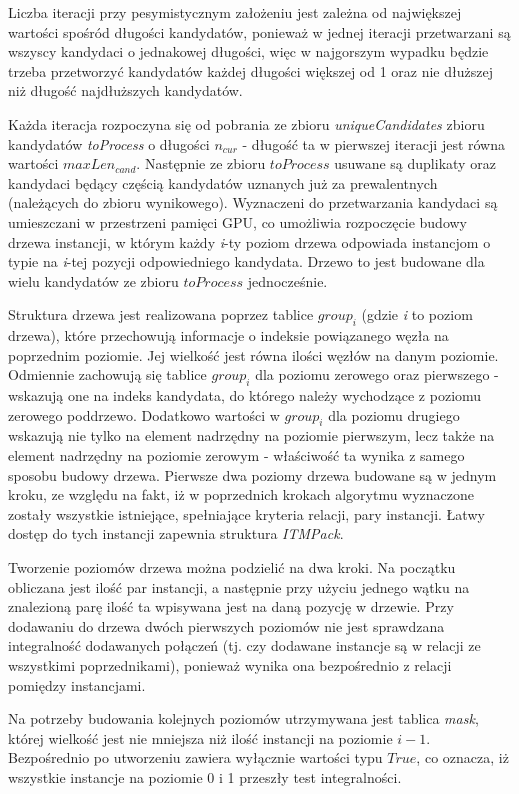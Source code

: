 \documentclass[12pt]{article}
\begin{document}
Liczba iteracji przy pesymistycznym założeniu jest zależna od największej wartości spośród długości kandydatów, ponieważ w jednej iteracji przetwarzani są wszyscy kandydaci o jednakowej długości, więc w najgorszym wypadku będzie trzeba przetworzyć kandydatów każdej długości większej od 1 oraz nie dłuższej niż długość najdłuższych kandydatów. 

Każda iteracja rozpoczyna się od pobrania ze zbioru \textit{uniqueCandidates} zbioru kandydatów \textit{toProcess} o długości $ n_{cur} $ - długość ta w pierwszej iteracji jest równa wartości $ maxLen_{cand} $. Następnie ze zbioru $ toProcess $ usuwane są duplikaty oraz kandydaci będący częścią kandydatów uznanych już za prewalentnych (należących do zbioru wynikowego). 
Wyznaczeni do przetwarzania kandydaci są umieszczani w przestrzeni pamięci GPU, co umożliwia rozpoczęcie budowy drzewa instancji, w którym każdy \textit{i}-ty poziom drzewa odpowiada instancjom o typie na \textit{i}-tej pozycji odpowiedniego kandydata. Drzewo to jest budowane dla wielu kandydatów ze zbioru $ toProcess $ jednocześnie.

Struktura drzewa jest realizowana poprzez tablice $ group_{i} $ (gdzie \textit{i} to poziom drzewa),   które przechowują informacje o indeksie powiązanego węzła na poprzednim poziomie. Jej wielkość jest równa ilości węzłów na danym poziomie. Odmiennie zachowują się tablice $ group_{i} $ dla poziomu zerowego oraz pierwszego - wskazują one na indeks kandydata, do którego należy wychodzące z poziomu zerowego poddrzewo. Dodatkowo wartości w $ group_{i} $ dla poziomu drugiego wskazują nie tylko na element nadrzędny na poziomie pierwszym, lecz także na element nadrzędny na poziomie zerowym - właściwość ta wynika z samego sposobu budowy drzewa. Pierwsze dwa poziomy drzewa budowane są w jednym kroku, ze względu na fakt, iż w poprzednich krokach algorytmu wyznaczone zostały wszystkie istniejące, spełniające kryteria relacji, pary instancji. Łatwy dostęp do tych instancji zapewnia struktura \textit{ITMPack}. 

Tworzenie poziomów drzewa można podzielić na dwa kroki. Na początku obliczana jest ilość par instancji, a następnie przy użyciu jednego wątku na znalezioną parę ilość ta wpisywana jest na daną pozycję w drzewie. Przy dodawaniu do drzewa dwóch pierwszych poziomów nie jest sprawdzana integralność dodawanych połączeń (tj. czy dodawane instancje są w relacji ze wszystkimi poprzednikami), ponieważ wynika ona bezpośrednio z relacji pomiędzy instancjami.

Na potrzeby budowania kolejnych poziomów utrzymywana jest tablica \textit{mask}, której wielkość jest nie mniejsza niż ilość instancji na poziomie $ i - 1 $. Bezpośrednio po utworzeniu zawiera wyłącznie wartości typu $ True $, co oznacza, iż wszystkie instancje na poziomie 0 i 1 przeszły test integralności.
\end{document}
